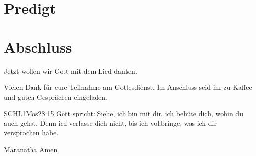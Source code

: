 \documentclass{mybib}
\begin{document}
\section{Predigt}










\section{Abschluss}

Jetzt wollen wir Gott mit dem Lied  danken.

Vielen Dank für eure Teilnahme am Gottesdienst. Im Anschluss seid ihr zu Kaffee und guten Gesprächen eingeladen.
\beten{}

\begin{bibelbox}{SCHL}{1Mos}{28:15}
Gott spricht: Siehe, ich bin mit dir,
ich behüte dich, wohin du auch gehst.
Denn ich verlasse dich nicht,
bis ich vollbringe, was ich dir versprochen habe.
\end{bibelbox}

Maranatha Amen
\end{document}
